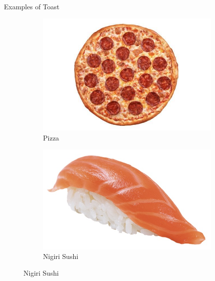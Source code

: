 \documentclass{beamer}
\begin{document}
\begin{frame}{Examples of Toast}
    \begin{figure}
        \begin{subfigure}{.4\textwidth}
          \centering
          \includegraphics[width=.8\linewidth]{toast/17_pizza.jpg}
          \caption{\label{fig:pizza}Pizza}
        \end{subfigure}%
        \begin{subfigure}{.4\textwidth}
          \centering
          \includegraphics[width=.8\linewidth]{toast/17_nigiri.jpg}
          \caption{\label{fig:nigiri}Nigiri Sushi}
        \end{subfigure}

\end{figure}
\end{frame}
\end{document}
